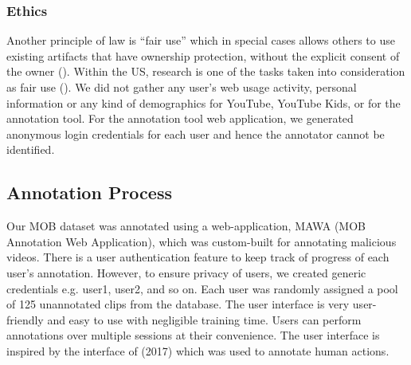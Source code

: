 \documentclass[letterpaper]{article}
\begin{document}
\subsubsection{Ethics}
Another principle of law is ``fair use'' which in special cases allows others to use existing artifacts that have ownership protection, without the explicit consent of the owner (\cite{fairuse}). Within the US, research is one of the tasks taken into consideration as fair use (\cite{fair}).  We did not gather any user's web usage activity, personal information or any kind of demographics for YouTube, YouTube Kids, or for the annotation tool. For the annotation tool web application, we generated anonymous login credentials for each user and hence the annotator cannot be identified.

\subsection{Annotation Process}\label{AT}
Our MOB dataset was annotated using a web-application, MAWA (MOB Annotation Web Application), which was custom-built for annotating malicious videos. There is a user authentication feature to keep track of progress of each user's annotation. However, to ensure privacy of users, we created generic credentials e.g. user1, user2, and so on. Each user was randomly assigned a pool of 125 unannotated clips from the database. The user interface is very user-friendly and easy to use with negligible training time. Users can perform annotations over multiple sessions at their convenience. The user interface is inspired by the interface of \citeauthor{kinetics} (2017) which was used to annotate human actions.
\end{document}
